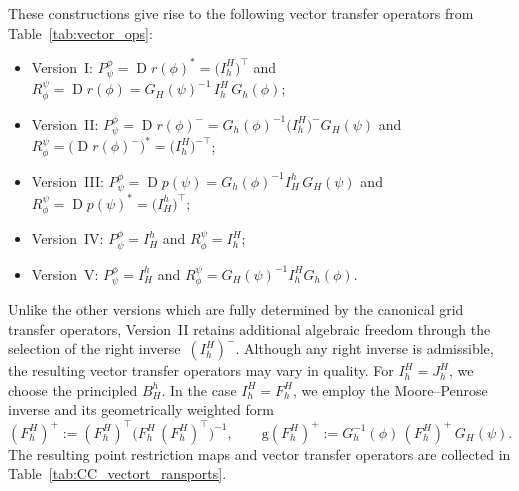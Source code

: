 \documentclass[11pt,reqno]{amsart}
\theoremstyle{plain}
\DeclareMathOperator{\Drm}{D}
\begin{document}
		These constructions give rise to the following vector transfer operators from Table~\ref{tab:vector_ops}:
		\begin{itemize}
			\item {Version~I}: %
			$P^{\phi}_{\psi} = \Drm r(\phi)^{\ast}
			= \bigl(I^H_h\bigr)^{\!\top}$ and 
			$R^{\psi}_{\phi} = \Drm r(\phi)
			= G_H(\psi)^{-1}\,I^H_h\,G_h(\phi)$;
			
			\item {Version~II}: %
			$P^{\phi}_{\psi} = \Drm r(\phi)^{-}
			= G_h(\phi)^{-1}\bigl(I^H_h\bigr)^{-}G_H(\psi)$ and 
			$R^{\psi}_{\phi} = \bigl(\Drm r(\phi)^{-}\bigr)^{\ast}
			= \bigl(I^H_h\bigr)^{-\top}$;
			
			\item {Version~III}: %
			$P^{\phi}_{\psi} = \Drm p(\psi)
			= G_h(\phi)^{-1}I^h_H\,G_H(\psi)$ and 
			$R^{\psi}_{\phi} = \Drm p(\psi)^{\ast}
			= \bigl(I^h_H\bigr)^{\top}$;
			
			\item {Version~IV}: %
			$P^{\phi}_{\psi} = I^h_H$ and 
			$R^{\psi}_{\phi} = I^H_h$;
			
			\item {Version~V}: %
			$P^{\phi}_{\psi} = I^h_H$ and 
			$R^{\psi}_{\phi} = G_H(\psi)^{-1} I^H_h G_h(\phi)$.
		\end{itemize}
		Unlike the other versions which are fully determined by the canonical grid transfer operators, Version~II retains additional algebraic freedom through the selection of the right inverse~$(I^H_h)^-$. Although any right inverse is admissible, the resulting vector transfer operators may vary in quality. For $I^H_h = J^H_h$, we choose the principled $B^h_H$. In the case $I^H_h = F^H_h$, we employ the Moore--Penrose inverse and its geometrically weighted form 
		\[
		(F^H_h)^+ := (F^H_h)^{\!\top}\bigl(F^H_h\,(F^H_h)^{\!\top}\bigr)^{-1}, \qquad
		\mathrm{g}(F^H_h)^+ := G_h^{-1}(\phi)\,(F^H_h)^+\,G_H(\psi).
		\]
		The resulting point restriction maps and vector transfer operators are collected in Table~\ref{tab:CC_vectort_ransports}.
		
\end{document}
